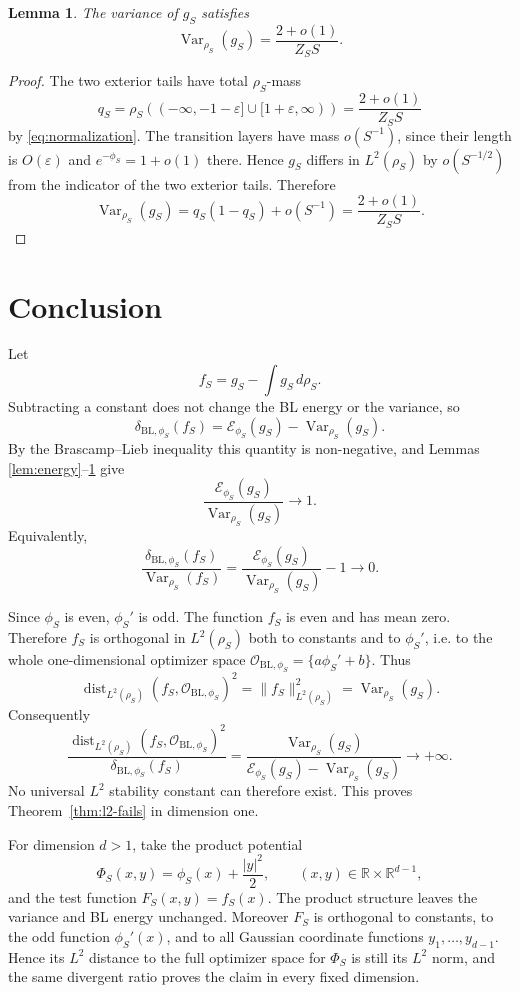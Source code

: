 \documentclass{article}
\newtheorem{lemma}[theorem]{Lemma}
\theoremstyle{remark}
\DeclareMathOperator{\Var}{Var}
\DeclareMathOperator{\dist}{dist}
\begin{document}
\begin{lemma}\label{lem:variance}
The variance of $g_S$ satisfies
\[
  \Var_{\rho_S}(g_S)=\frac{2+o(1)}{Z_S S}.
\]
\end{lemma}

\begin{proof}
The two exterior tails have total $\rho_S$-mass
\[
  q_S=\rho_S((-\infty,-1-\varepsilon]\cup[1+\varepsilon,\infty))
      =\frac{2+o(1)}{Z_S S}
\]
by \eqref{eq:normalization}.  The transition layers have mass $o(S^{-1})$, since
their length is $O(\varepsilon)$ and $e^{-\phi_S}=1+o(1)$ there.  Hence
$g_S$ differs in $L^2(\rho_S)$ by $o(S^{-1/2})$ from the indicator of the two
exterior tails.  Therefore
\[
  \Var_{\rho_S}(g_S)=q_S(1-q_S)+o(S^{-1})
  =\frac{2+o(1)}{Z_S S}.
\]
\end{proof}

\section{Conclusion}

Let
\[
  f_S=g_S-\int g_S\,d\rho_S .
\]
Subtracting a constant does not change the BL energy or the variance, so
\[
  \delta_{\mathrm{BL},\phi_S}(f_S)
  =
  \mathcal E_{\phi_S}(g_S)-\Var_{\rho_S}(g_S).
\]
By the Brascamp--Lieb inequality this quantity is non-negative, and Lemmas
\ref{lem:energy}--\ref{lem:variance} give
\[
  \frac{\mathcal E_{\phi_S}(g_S)}{\Var_{\rho_S}(g_S)}\longrightarrow 1.
\]
Equivalently,
\[
  \frac{\delta_{\mathrm{BL},\phi_S}(f_S)}
       {\Var_{\rho_S}(f_S)}
  =
  \frac{\mathcal E_{\phi_S}(g_S)}{\Var_{\rho_S}(g_S)}-1
  \longrightarrow 0.
\]

Since $\phi_S$ is even, $\phi_S'$ is odd.  The function $f_S$ is even and has
mean zero.  Therefore $f_S$ is orthogonal in $L^2(\rho_S)$ both to constants and
to $\phi_S'$, i.e. to the whole one-dimensional optimizer space
$\mathcal O_{\mathrm{BL},\phi_S}=\{a\phi_S'+b\}$.  Thus
\[
  \dist_{L^2(\rho_S)}(f_S,\mathcal O_{\mathrm{BL},\phi_S})^2
  =
  \|f_S\|_{L^2(\rho_S)}^2
  =
  \Var_{\rho_S}(g_S).
\]
Consequently
\[
  \frac{
  \dist_{L^2(\rho_S)}(f_S,\mathcal O_{\mathrm{BL},\phi_S})^2}
  {\delta_{\mathrm{BL},\phi_S}(f_S)}
  =
  \frac{\Var_{\rho_S}(g_S)}
       {\mathcal E_{\phi_S}(g_S)-\Var_{\rho_S}(g_S)}
  \longrightarrow+\infty .
\]
No universal $L^2$ stability constant can therefore exist.  This proves
Theorem~\ref{thm:l2-fails} in dimension one.

For dimension $d>1$, take the product potential
\[
  \Phi_S(x,y)=\phi_S(x)+\frac{|y|^2}{2},
  \qquad (x,y)\in\mathbb R\times\mathbb R^{d-1},
\]
and the test function $F_S(x,y)=f_S(x)$.  The product structure leaves the
variance and BL energy unchanged.  Moreover $F_S$ is orthogonal to constants,
to the odd function $\phi_S'(x)$, and to all Gaussian coordinate functions
$y_1,\ldots,y_{d-1}$.  Hence its $L^2$ distance to the full optimizer space for
$\Phi_S$ is still its $L^2$ norm, and the same divergent ratio proves the claim
in every fixed dimension.
\end{document}
